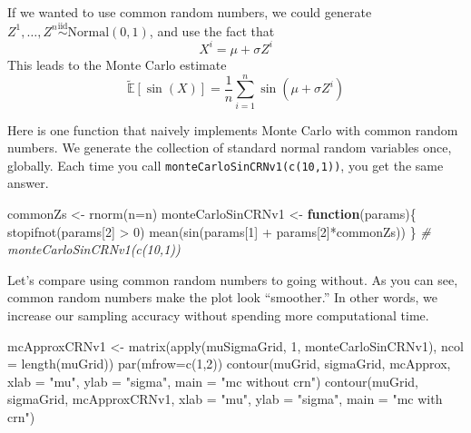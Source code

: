 \documentclass[
  12pt,
  krantz2]{krantz}
\makeatletter
\newenvironment{Shaded}{\begin{snugshade}}{\end{snugshade}}
\newcommand{\AttributeTok}[1]{\textcolor[rgb]{0.61,0.61,0.61}{#1}}
\newcommand{\CommentTok}[1]{\textcolor[rgb]{0.37,0.37,0.37}{\textit{#1}}}
\newcommand{\ControlFlowTok}[1]{\textcolor[rgb]{0.27,0.27,0.27}{\textbf{#1}}}
\newcommand{\DecValTok}[1]{\textcolor[rgb]{0.06,0.06,0.06}{#1}}
\newcommand{\FunctionTok}[1]{\textcolor[rgb]{0,0,0}{#1}}
\newcommand{\NormalTok}[1]{#1}
\newcommand{\OtherTok}[1]{\textcolor[rgb]{0.37,0.37,0.37}{#1}}
\newcommand{\SpecialCharTok}[1]{\textcolor[rgb]{0,0,0}{#1}}
\newcommand{\StringTok}[1]{\textcolor[rgb]{0.5,0.5,0.5}{#1}}
\newenvironment{kframe}{%
\medskip{}
\setlength{\fboxsep}{.8em}
 \def\at@end@of@kframe{}%
 \ifinner\ifhmode%
  \def\at@end@of@kframe{\end{minipage}}%
  \begin{minipage}{\columnwidth}%
 \fi\fi%
 \def\FrameCommand##1{\hskip\@totalleftmargin \hskip-\fboxsep
 \colorbox{shadecolor}{##1}\hskip-\fboxsep
     \hskip-\linewidth \hskip-\@totalleftmargin \hskip\columnwidth}%
 \MakeFramed {\advance\hsize-\width
   \@totalleftmargin\z@ \linewidth\hsize
   \@setminipage}}%
 {\par\unskip\endMakeFramed%
 \at@end@of@kframe}
\renewenvironment{Shaded}{\begin{kframe}}{\end{kframe}}
\makeatother
\begin{document}
If we wanted to use common random numbers, we could generate \(Z^1, \ldots, Z^n \overset{\text{iid}}{\sim} \text{Normal}(0, 1)\), and use the fact that
\[
X^i = \mu + \sigma Z^i
\]
This leads to the Monte Carlo estimate
\[
\tilde{\mathbb{E}}[\sin(X)] = \frac{1}{n}\sum_{i=1}^n\sin(\mu + \sigma Z^i)
\]

Here is one function that naively implements Monte Carlo with common random numbers. We generate the collection of standard normal random variables once, globally. Each time you call \texttt{monteCarloSinCRNv1(c(10,1))}, you get the same answer.

\begin{Shaded}
\begin{Highlighting}[]
\NormalTok{commonZs }\OtherTok{\textless{}{-}} \FunctionTok{rnorm}\NormalTok{(}\AttributeTok{n=}\NormalTok{n)}
\NormalTok{monteCarloSinCRNv1 }\OtherTok{\textless{}{-}} \ControlFlowTok{function}\NormalTok{(params)\{}
  \FunctionTok{stopifnot}\NormalTok{(params[}\DecValTok{2}\NormalTok{] }\SpecialCharTok{\textgreater{}} \DecValTok{0}\NormalTok{) }
  \FunctionTok{mean}\NormalTok{(}\FunctionTok{sin}\NormalTok{(params[}\DecValTok{1}\NormalTok{] }\SpecialCharTok{+}\NormalTok{ params[}\DecValTok{2}\NormalTok{]}\SpecialCharTok{*}\NormalTok{commonZs))}
\NormalTok{\} }
\CommentTok{\# monteCarloSinCRNv1(c(10,1))}
\end{Highlighting}
\end{Shaded}

Let's compare using common random numbers to going without. As you can see, common random numbers make the plot look ``smoother.'' In other words, we increase our sampling accuracy without spending more computational time.

\begin{Shaded}
\begin{Highlighting}[]
\NormalTok{mcApproxCRNv1 }\OtherTok{\textless{}{-}} \FunctionTok{matrix}\NormalTok{(}\FunctionTok{apply}\NormalTok{(muSigmaGrid, }\DecValTok{1}\NormalTok{, monteCarloSinCRNv1), }
                        \AttributeTok{ncol =} \FunctionTok{length}\NormalTok{(muGrid))}
\FunctionTok{par}\NormalTok{(}\AttributeTok{mfrow=}\FunctionTok{c}\NormalTok{(}\DecValTok{1}\NormalTok{,}\DecValTok{2}\NormalTok{))}
\FunctionTok{contour}\NormalTok{(muGrid, sigmaGrid, mcApprox, }
        \AttributeTok{xlab =} \StringTok{"mu"}\NormalTok{, }\AttributeTok{ylab =} \StringTok{"sigma"}\NormalTok{, }\AttributeTok{main =} \StringTok{"mc without crn"}\NormalTok{)}
\FunctionTok{contour}\NormalTok{(muGrid, sigmaGrid, mcApproxCRNv1, }
        \AttributeTok{xlab =} \StringTok{"mu"}\NormalTok{, }\AttributeTok{ylab =} \StringTok{"sigma"}\NormalTok{, }\AttributeTok{main =} \StringTok{"mc with crn"}\NormalTok{)}
\end{Highlighting}
\end{Shaded}
\end{document}
